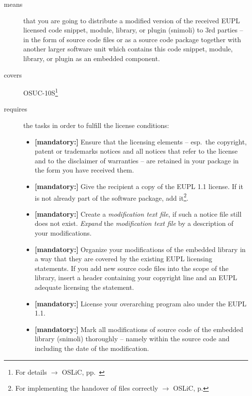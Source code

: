 \begin{description}
\item[means] that you are going to distribute a modified version of the received
EUPL licensed code snippet, module, library, or plugin (snimoli) to 3rd parties
-- in the form of source code files or as a source code package together with
another larger software unit which contains this code snippet, module, library,
or plugin as an embedded component.
\item[covers] OSUC-10S\footnote{For details $\rightarrow$ OSLiC, pp.\
\pageref{OSUC-10S-DEF}}
\item[requires] the tasks in order to fulfill the license conditions:
\begin{itemize}

  \item \textbf{[mandatory:]} Ensure that the licensing elements -- esp.\ the
  copyright, patent or trademarks notices and all notices that refer to the
  license and to the disclaimer of warranties -- are retained in your package in
  the form you have received them.

  \item \textbf{[mandatory:]} Give the recipient a copy of the EUPL 1.1
  license. If it is not already part of the software package, add
  it\footnote{For implementing the handover of files correctly $\rightarrow$
  OSLiC, p. \pageref{DistributingFilesHint}}.

  \item \textbf{[mandatory:]} Create a \emph{modification text file}, if such a
  notice file still does not exist. \emph{Expand} the \emph{modification text
  file} by a description of your modifications.
  
  \item \textbf{[mandatory:]} Organize your modifications of the embedded
  library in a way that they are covered by the existing EUPL licensing
  statements. If you add new source code files into the scope of the library,
  insert a header containing your copyright line and an EUPL adequate licensing
  the statement.
  
  \item \textbf{[mandatory:]} License your overarching program also under the
  EUPL 1.1.
  
  \item \textbf{[mandatory:]} Mark all modifications of source code of the
  embedded library (snimoli) thoroughly -- namely within the source code and
  including the date of the modification.
  

\end{itemize}
\end{description}
